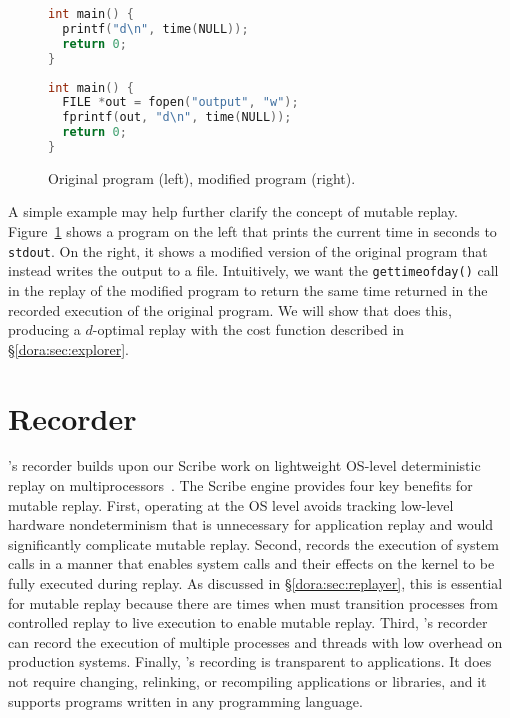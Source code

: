 \begin{figure}
\centering
\begin{minipage}{.8\textwidth}
\begin{minipage}{.5\textwidth}
\begin{lstlisting}[framexleftmargin=5pt,language=C]
int main() {
  printf("d\n", time(NULL));
  return 0;
}
\end{lstlisting}
\end{minipage}
\hspace{0.4in}
\begin{minipage}{.5\textwidth}
\begin{lstlisting}[framexleftmargin=5pt,language=C]
int main() {
  FILE *out = fopen("output", "w");
  fprintf(out, "d\n", time(NULL));
  return 0;
}
\end{lstlisting}
\end{minipage}
\end{minipage}
\caption{{Original program (left), modified program (right).}}
\label{dora:fig:code-example}
\end{figure}


A simple example may help further clarify the concept of
mutable replay.  Figure~\ref{dora:fig:code-example} shows a program on the left that
prints the current time in seconds to {\tt stdout}. On the right, it
shows a modified version of the original program that instead writes the output to a file.
Intuitively, we want the {\tt gettimeofday()} call in the replay of the
modified program to return the same time returned in the recorded
execution of the original program.
We will show that {\dora} does this, producing a $d$-optimal replay
with the cost function described in \S\ref{dora:sec:explorer}. 

\section{Recorder}
\label{dora:sec:recorder}

{\dora}'s recorder builds upon our Scribe work on lightweight OS-level
deterministic replay on multiprocessors~\cite{scribe:sigmetrics10}.
The Scribe engine provides four key benefits for mutable replay. First, operating
at the OS level avoids tracking low-level hardware nondeterminism that
is unnecessary for application replay and would significantly
complicate mutable replay.  Second, {\dora} records the execution
of system calls in a manner that enables system calls and their effects
on the kernel to be fully executed during replay.  As discussed in
\S\ref{dora:sec:replayer}, this is essential for mutable replay
because there are times when {\dora} must transition processes
from controlled replay to live execution to enable mutable replay.
Third, {\dora}'s recorder can record the execution of multiple
processes and threads with low overhead on production systems. Finally,
{\dora}'s recording is transparent to applications.  It does not
require changing, relinking, or recompiling applications or libraries,
and it supports programs written in any programming language.

